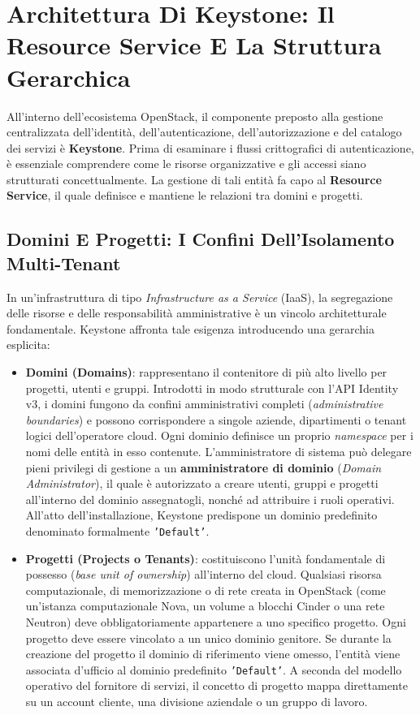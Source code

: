 \documentclass[11pt, a4paper]{article}
\begin{document}
\section{Architettura Di Keystone: Il Resource Service E La Struttura Gerarchica}

All'interno dell'ecosistema OpenStack, il componente preposto alla gestione centralizzata dell'identità, dell'autenticazione, dell'autorizzazione e del catalogo dei servizi è \textbf{Keystone}. Prima di esaminare i flussi crittografici di autenticazione, è essenziale comprendere come le risorse organizzative e gli accessi siano strutturati concettualmente. La gestione di tali entità fa capo al \textbf{Resource Service}, il quale definisce e mantiene le relazioni tra domini e progetti.

\subsection{Domini E Progetti: I Confini Dell'Isolamento Multi-Tenant}

In un'infrastruttura di tipo \emph{Infrastructure as a Service} (IaaS), la segregazione delle risorse e delle responsabilità amministrative è un vincolo architetturale fondamentale. Keystone affronta tale esigenza introducendo una gerarchia esplicita:

\begin{itemize}[noitemsep]
    \item \textbf{Domini (Domains)}: rappresentano il contenitore di più alto livello per progetti, utenti e gruppi. Introdotti in modo strutturale con l'API Identity v3, i domini fungono da confini amministrativi completi (\emph{administrative boundaries}) e possono corrispondere a singole aziende, dipartimenti o tenant logici dell'operatore cloud. Ogni dominio definisce un proprio \emph{namespace} per i nomi delle entità in esso contenute. L'amministratore di sistema può delegare pieni privilegi di gestione a un \textbf{amministratore di dominio} (\emph{Domain Administrator}), il quale è autorizzato a creare utenti, gruppi e progetti all'interno del dominio assegnatogli, nonché ad attribuire i ruoli operativi. All'atto dell'installazione, Keystone predispone un dominio predefinito denominato formalmente \texttt{'Default'}.
    \item \textbf{Progetti (Projects o Tenants)}: costituiscono l'unità fondamentale di possesso (\emph{base unit of ownership}) all'interno del cloud. Qualsiasi risorsa computazionale, di memorizzazione o di rete creata in OpenStack (come un'istanza computazionale Nova, un volume a blocchi Cinder o una rete Neutron) deve obbligatoriamente appartenere a uno specifico progetto. Ogni progetto deve essere vincolato a un unico dominio genitore. Se durante la creazione del progetto il dominio di riferimento viene omesso, l'entità viene associata d'ufficio al dominio predefinito \texttt{'Default'}. A seconda del modello operativo del fornitore di servizi, il concetto di progetto mappa direttamente su un account cliente, una divisione aziendale o un gruppo di lavoro.
\end{itemize}
\end{document}

